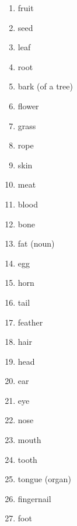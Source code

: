\begin{multicols}{2}
\begin{enumerate}
\item   fruit 

\item   seed 

\item   leaf 

\item   root 

\item   bark (of a tree) 

\item   flower 

\item   grass 

\item   rope 

\item   skin 

\item   meat 

\item   blood 

\item   bone 

\item   fat (noun) 

\item   egg 

\item   horn 

\item   tail 

\item   feather 

\item   hair 

\item   head 

\item   ear 

\item   eye 

\item   nose 

\item   mouth 

\item   tooth 

\item   tongue (organ) 

\item   fingernail 

\item   foot 


\end{enumerate}
\end{multicols}
